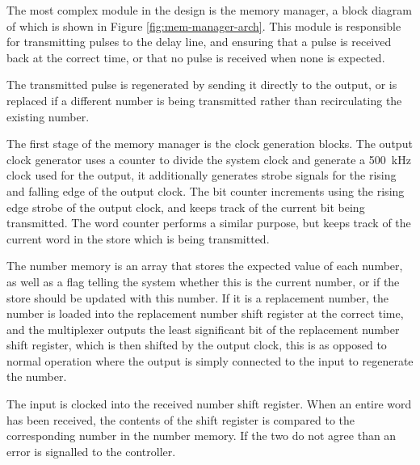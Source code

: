 The most complex module in the design is the memory manager, a block diagram of which is shown in Figure \ref{fig:mem-manager-arch}. This module is responsible for transmitting pulses to the delay line, and ensuring that a pulse is received back at the correct time, or that no pulse is received when none is expected.

The transmitted pulse is regenerated by sending it directly to the output, or is replaced if a different number is being transmitted rather than recirculating the existing number.

The first stage of the memory manager is the clock generation blocks. The output clock generator uses a counter to divide the system clock and generate a \SI{500}{\kilo\hertz} clock used for the output, it additionally generates strobe signals for the rising and falling edge of the output clock. The bit counter increments using the rising edge strobe of the output clock, and keeps track of the current bit being transmitted. The word counter performs a similar purpose, but keeps track of the current word in the store which is being transmitted.

The number memory is an array that stores the expected value of each number, as well as a flag telling the system whether this is the current number, or if the store should be updated with this number. If it is a replacement number, the number is loaded into the replacement number shift register at the correct time, and the multiplexer outputs the least significant bit of the replacement number shift register, which is then shifted by the output clock, this is as opposed to normal operation where the output is simply connected to the input to regenerate the number.

The input is clocked into the received number shift register. When an entire word has been received, the contents of the shift register is compared to the corresponding number in the number memory. If the two do not agree than an error is signalled to the controller.

